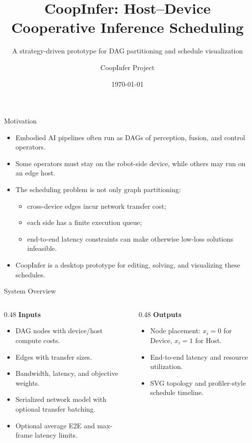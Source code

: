 \documentclass[aspectratio=169]{beamer}
\title[CoopInfer]{CoopInfer: Host--Device Cooperative Inference Scheduling}
\subtitle{A strategy-driven prototype for DAG partitioning and schedule visualization}
\author{CoopInfer Project}
\date{\today}
\newcommand{\device}{\textsf{Device}}
\newcommand{\host}{\textsf{Host}}
\begin{document}
\begin{frame}
  \titlepage
\end{frame}

\begin{frame}{Motivation}
  \begin{itemize}
    \item Embodied AI pipelines often run as DAGs of perception, fusion, and control operators.
    \item Some operators must stay on the robot-side device, while others may run on an edge host.
    \item The scheduling problem is not only graph partitioning:
      \begin{itemize}
        \item cross-device edges incur network transfer cost;
        \item each side has a finite execution queue;
        \item end-to-end latency constraints can make otherwise low-loss solutions infeasible.
      \end{itemize}
    \item CoopInfer is a desktop prototype for editing, solving, and visualizing these schedules.
  \end{itemize}
\end{frame}

\begin{frame}{System Overview}
  \begin{columns}[T,onlytextwidth]
    \begin{column}{0.48\textwidth}
      \textbf{Inputs}
      \begin{itemize}
        \item DAG nodes with device/host compute costs.
        \item Edges with transfer sizes.
        \item Bandwidth, latency, and objective weights.
        \item Serialized network model with optional transfer batching.
        \item Optional average E2E and max-frame latency limits.
      \end{itemize}
    \end{column}
    \begin{column}{0.48\textwidth}
      \textbf{Outputs}
      \begin{itemize}
        \item Node placement: $x_i=0$ for \device, $x_i=1$ for \host.
        \item End-to-end latency and resource utilization.
        \item SVG topology and profiler-style schedule timeline.
      \end{itemize}
    \end{column}
  \end{columns}
\end{frame}
\end{document}
